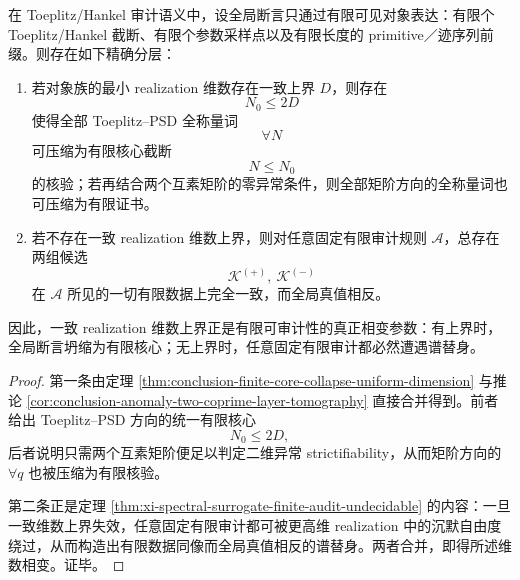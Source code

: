 \begin{theorem}[有限可审计性的维数相变]\label{thm:conclusion-finite-audit-dimension-phase-transition}
在 Toeplitz/Hankel 审计语义中，设全局断言只通过有限可见对象表达：有限个 Toeplitz/Hankel 截断、有限个参数采样点以及有限长度的 primitive／迹序列前缀。则存在如下精确分层：
\begin{enumerate}
  \item 若对象族的最小 realization 维数存在一致上界 \(D\)，则存在
  \[
  N_0\le 2D
  \]
  使得全部 Toeplitz--PSD 全称量词
  \[
  \forall N
  \]
  可压缩为有限核心截断
  \[
  N\le N_0
  \]
  的核验；若再结合两个互素矩阶的零异常条件，则全部矩阶方向的全称量词也可压缩为有限证书。

  \item 若不存在一致 realization 维数上界，则对任意固定有限审计规则 \(\mathcal A\)，总存在两组候选
  \[
  \mathcal K^{(+)},\ \mathcal K^{(-)}
  \]
  在 \(\mathcal A\) 所见的一切有限数据上完全一致，而全局真值相反。
\end{enumerate}
因此，一致 realization 维数上界正是有限可审计性的真正相变参数：有上界时，全局断言坍缩为有限核心；无上界时，任意固定有限审计都必然遭遇谱替身。
\end{theorem}
\begin{proof}
第一条由定理 \ref{thm:conclusion-finite-core-collapse-uniform-dimension} 与推论 \ref{cor:conclusion-anomaly-two-coprime-layer-tomography} 直接合并得到。前者给出 Toeplitz--PSD 方向的统一有限核心
\[
N_0\le 2D,
\]
后者说明只需两个互素矩阶便足以判定二维异常 strictifiability，从而矩阶方向的 \(\forall q\) 也被压缩为有限核验。

第二条正是定理 \ref{thm:xi-spectral-surrogate-finite-audit-undecidable} 的内容：一旦一致维数上界失效，任意固定有限审计都可被更高维 realization 中的沉默自由度绕过，从而构造出有限数据同像而全局真值相反的谱替身。两者合并，即得所述维数相变。证毕。
\end{proof}

